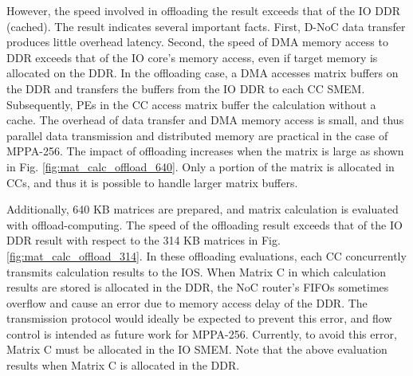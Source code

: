 However, the speed involved in offloading the result exceeds that of the IO DDR (cached).
The result indicates several important facts.
First, D-NoC data transfer produces little overhead latency.
Second, the speed of DMA memory access to DDR exceeds that of the IO core's memory access, even if target memory is allocated on the DDR.
In the offloading case, a DMA accesses matrix buffers on the DDR and transfers the buffers from the IO DDR to each CC SMEM.
Subsequently, PEs in the CC access matrix buffer the calculation without a cache.
The overhead of data transfer and DMA memory access is small, and thus parallel data transmission and distributed memory are practical in the case of MPPA-256.
The impact of offloading increases when the matrix is large as shown in Fig. \ref{fig:mat_calc_offload_640}.
Only a portion of the matrix is allocated in CCs, and thus it is possible to handle larger matrix buffers.

Additionally, 640 KB matrices are prepared, and matrix calculation is evaluated with offload-computing.
The speed of the offloading result exceeds that of the IO DDR result with respect to the 314 KB matrices in Fig. \ref{fig:mat_calc_offload_314}.
In these offloading evaluations, each CC concurrently transmits calculation results to the IOS.
When Matrix C in which calculation results are stored is allocated in the DDR, the NoC router's FIFOs sometimes overflow and cause an error due to memory access delay of the DDR.
The transmission protocol would ideally be expected to prevent this error, and flow control is intended as future work for MPPA-256.
Currently, to avoid this error, Matrix C must be allocated in the IO SMEM.
Note that the above evaluation results when Matrix C is allocated in the DDR.


